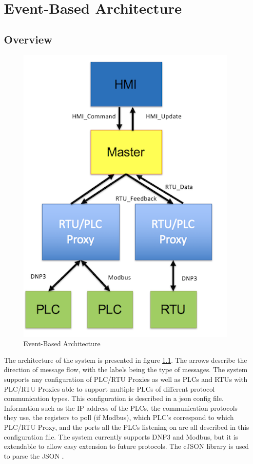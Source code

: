 \documentclass[oneside,11pt,a4paper,oldfontcommands]{book}
\begin{document}
\chapter{Event-Based Architecture}

\section{Overview}

\begin{figure}[ht]
  \begin{center}
  \includegraphics{new_architecture}
  \caption{Event-Based Architecture}
  \label{fig:2}
  \end{center}
\end{figure}

\indent \indent
The architecture of the system is presented in figure \ref{fig:2}. The arrows describe
the direction of message flow, with the labels being the type of messages. The system
supports any configuration of PLC/RTU Proxies as well as PLCs and RTUs
with PLC/RTU Proxies able to support multiple
PLCs of different protocol communication types. 
This configuration is described in a json config file. 
Information such as the IP address of the PLCs, the communication protocols they use,
the registers to poll (if Modbus), which PLC's correspond to which PLC/RTU Proxy,
and the ports all the PLCs listening on are all described in this configuration file. 
The system currently supports DNP3 and Modbus, but it is extendable to allow
easy extension to future protocols. The cJSON library is used to parse
the JSON \cite{cJSON}.\\
\end{document}
